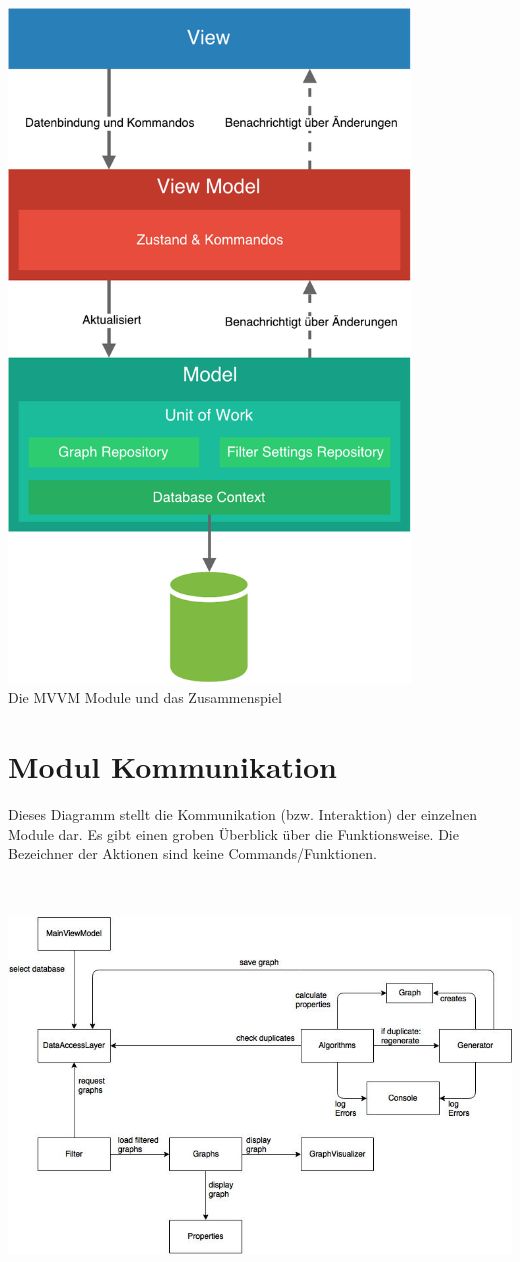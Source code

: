 \documentclass[13pt]{scrreprt}
\begin{document}
	\begin{center}
	\includegraphics[width=0.8\textwidth, angle=0]{SystemArchitektur.pdf}  	
	\\
    Die MVVM Module und das Zusammenspiel
    \end{center}	
    

	\section{Modul Kommunikation}
	Dieses Diagramm stellt die Kommunikation (bzw. Interaktion) der einzelnen Module dar. Es gibt einen groben Überblick über die Funktionsweise. Die Bezeichner der Aktionen sind keine Commands/Funktionen.
	\\ \ 
	\\ \ 


	\includegraphics[scale=0.7, center]{ModuleCommunication.jpg}
\end{document}
